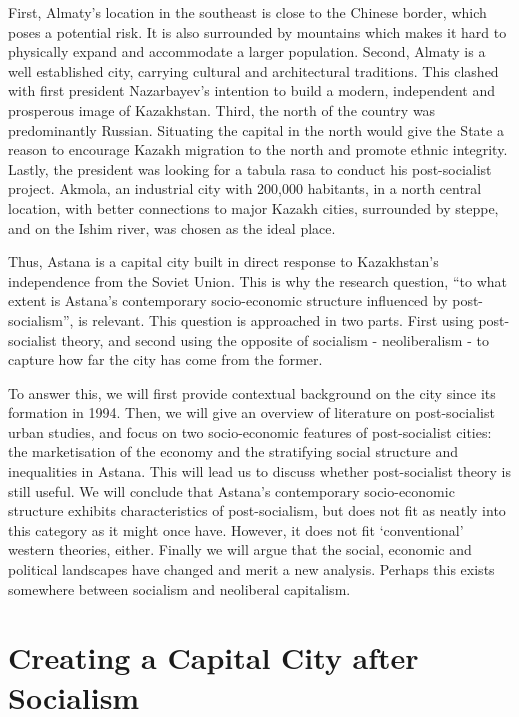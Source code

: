 \documentclass{article}
\begin{document}
First, Almaty's location in the southeast is close to the Chinese border, which poses a potential risk. It is also surrounded by mountains which makes it hard to physically expand and accommodate a larger population. 
Second, Almaty is a well established city, carrying cultural and architectural traditions. This clashed with first president Nazarbayev's intention to build a modern, independent and prosperous image of Kazakhstan. 
Third, the north of the country was predominantly Russian. Situating the capital in the north would give the State a reason to encourage Kazakh migration to the north and promote ethnic integrity.
 Lastly, the president was looking for a tabula rasa to conduct his post-socialist project. Akmola, an industrial city with 200,000 habitants, in a north central location, with better connections to major Kazakh cities, surrounded by steppe, and on the Ishim river, was chosen as the ideal place.

Thus, Astana is a capital city built in direct response to Kazakhstan's independence from the Soviet Union. This is why the research question, “to what extent is Astana's contemporary socio-economic structure influenced by post-socialism”, is relevant. This question is approached in two parts. First using post-socialist theory, and second using the opposite of socialism - neoliberalism - to capture how far the city has come from the former.

To answer this, we will first provide contextual background on the city since its formation in 1994. Then, we will give an overview of literature on post-socialist urban studies, and focus on two socio-economic features of post-socialist cities: the marketisation of the economy and the stratifying social structure and inequalities in Astana. 
This will lead us to discuss whether post-socialist theory is still useful. We will conclude that Astana's contemporary socio-economic structure exhibits characteristics of post-socialism, but does not fit as neatly into this category as it might once have. However, it does not fit `conventional' western theories, either. Finally we will argue that the social, economic and political landscapes have changed and merit a new analysis. Perhaps this exists somewhere between socialism and neoliberal capitalism.

\section{Creating a Capital City after Socialism}
\end{document}
